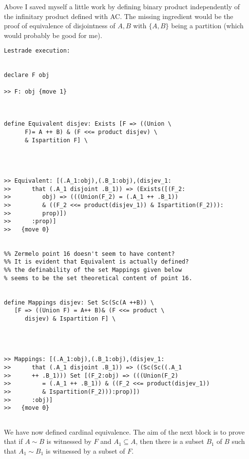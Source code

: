 \documentclass[12pt]{article}
\begin{document}
Above I saved myself a little work by defining binary product independently of the infinitary product defined with AC.  The missing ingredient would be the proof of equivalence
of disjointness of $A,B$ with $\{A,B\}$ being a partition (which would probably be good for me).

\begin{verbatim}Lestrade execution:


declare F obj

>> F: obj {move 1}



define Equivalent disjev: Exists [F => ((Union \
      F)= A ++ B) & (F <<= product disjev) \
      & Ispartition F] \
   



>> Equivalent: [(.A_1:obj),(.B_1:obj),(disjev_1:
>>      that (.A_1 disjoint .B_1)) => (Exists([(F_2:
>>         obj) => (((Union(F_2) = (.A_1 ++ .B_1))
>>         & ((F_2 <<= product(disjev_1)) & Ispartition(F_2))):
>>         prop)])
>>      :prop)]
>>   {move 0}


%% Zermelo point 16 doesn't seem to have content?
%% It is evident that Equivalent is actually defined?
%% the definability of the set Mappings given below
% seems to be the set theoretical content of point 16.


define Mappings disjev: Set Sc(Sc(A ++B)) \
   [F => ((Union F) = A++ B)& (F <<= product \
      disjev) & Ispartition F] \
   



>> Mappings: [(.A_1:obj),(.B_1:obj),(disjev_1:
>>      that (.A_1 disjoint .B_1)) => ((Sc(Sc((.A_1
>>      ++ .B_1))) Set [(F_2:obj) => (((Union(F_2)
>>         = (.A_1 ++ .B_1)) & ((F_2 <<= product(disjev_1))
>>         & Ispartition(F_2))):prop)])
>>      :obj)]
>>   {move 0}


\end{verbatim}

We have now defined cardinal equivalence.  The aim of the next block is to prove that if $A \sim B$ is witnessed by $F$ and $A_1 \subseteq A$, then there is a subset $B_1$ of
$B$ such that $A_1 \sim B_1$ is witnessed by a subset of $F$.
\end{document}
